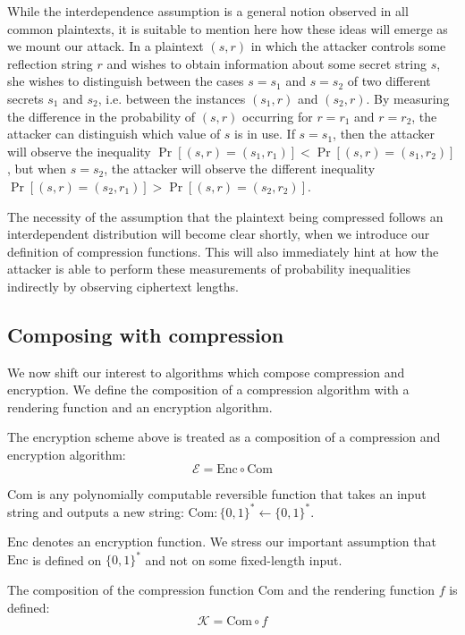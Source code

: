 \documentclass[conference, letterpaper, 10pt]{IEEEtran}
\begin{document}
While the interdependence assumption is a general notion observed in all common
plaintexts, it is suitable to mention here how these ideas will emerge as we
mount our attack. In a plaintext $(s, r)$ in which the attacker controls some
reflection string $r$ and wishes to obtain information about some secret string
$s$, she wishes to distinguish between the cases $s = s_1$ and $s = s_2$ of two
different secrets $s_1$ and $s_2$, i.e. between the instances $(s_1, r)$ and
$(s_2, r)$. By measuring the difference in the probability of $(s, r)$
occurring for $r = r_1$ and $r = r_2$, the attacker can distinguish which value
of $s$ is in use. If $s = s_1$, then the attacker will observe the inequality
$\Pr[(s, r) = (s_1, r_1)] < \Pr[(s, r) = (s_1, r_2)]$, but when $s = s_2$, the
attacker will observe the different inequality $\Pr[(s, r) = (s_2, r_1)] >
\Pr[(s, r) = (s_2, r_2)]$.

The necessity of the assumption that the plaintext being compressed follows an
interdependent distribution will become clear shortly, when we introduce our
definition of compression functions. This will also immediately hint at how the
attacker is able to perform these measurements of probability inequalities
indirectly by observing ciphertext lengths.

\subsection{Composing with compression}\label{subsec:comcompose}

We now shift our interest to algorithms which compose compression and
encryption. We define the composition of a compression algorithm with a
rendering function and an encryption algorithm.

The encryption scheme above is treated as a composition of a
compression and encryption algorithm:
\begin{equation*}
    \mathcal{E} = \textrm{Enc} \circ \textrm{Com}
\end{equation*}

$\textrm{Com}$ is any polynomially computable reversible function that takes an
input string and outputs a new string: $\textrm{Com}: \{0, 1\}^* \leftarrow \{0,
1\}^*$.

$\textrm{Enc}$ denotes an encryption function. We stress our important
assumption that $\textrm{Enc}$ is defined on $\{0, 1\}^*$ and not on some
fixed-length input.

The composition of the compression function $\textrm{Com}$ and the rendering function $f$
is defined:
\begin{equation*}
    \mathcal{K} = \textrm{Com} \circ f
\end{equation*}
\end{document}
